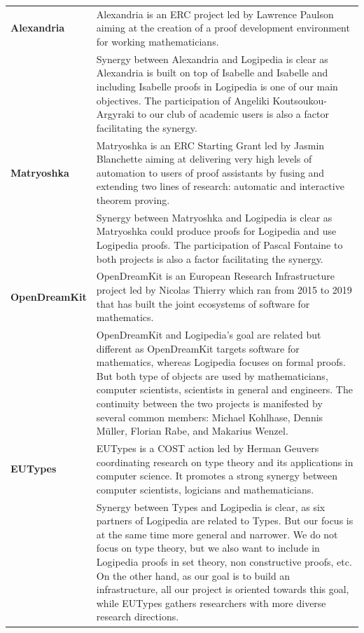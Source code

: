 \begin{longtable}{|p{}|p{}|}
\hline 
{\bf Alexandria}
&
Alexandria is an ERC project led by Lawrence Paulson aiming at the
creation of a proof development environment for working mathematicians.
\\
&
\hspace{0.4cm}
Synergy between Alexandria and Logipedia is clear as Alexandria
is built on top of Isabelle and Isabelle and including Isabelle proofs
in Logipedia is one of our main objectives.  The participation of
Angeliki Koutsoukou-Argyraki to our club of academic users is also
a factor facilitating the synergy.
\\
\hline
{\bf Matryoshka} 
& 
Matryoshka is an ERC Starting Grant led by Jasmin Blanchette aiming at
delivering very high levels of automation to users of proof assistants
by fusing and extending two lines of research: automatic and
interactive theorem proving.
\\
&
\hspace{0.4cm} Synergy between Matryoshka and Logipedia is clear
as Matryoshka could produce proofs for Logipedia and use Logipedia
proofs. The participation of Pascal Fontaine to both projects is also a
factor facilitating the synergy.
\\
\hline
{\bf OpenDreamKit} 
& 
OpenDreamKit is an European Research Infrastructure project led by
Nicolas Thierry which ran from 2015 to 2019 that has built the joint
ecosystems of software for mathematics.
\\
&
\hspace{0.4cm}
OpenDreamKit and Logipedia's goal are related but different as OpenDreamKit
targets software for mathematics, whereas Logipedia focuses on formal proofs. But both type 
of objects are used by mathematicians, computer scientists, scientists in 
general and engineers. The continuity between the two projects is manifested 
by several common members: Michael Kohlhase, Dennis Müller, 
Florian Rabe, and Makarius Wenzel. 
\\
\hline
{\bf EUTypes} 
& 
EUTypes is a COST action led by Herman Geuvers coordinating research
on type theory and its applications in computer science.  It promotes
a strong synergy between computer scientists, logicians and
mathematicians.
\\
&
\hspace{0.4cm}
Synergy between Types and Logipedia is clear, as six partners of
Logipedia are related to Types. But our focus is at the same time more
general and narrower. We do not focus on type theory, but we also want
to include in Logipedia proofs in set theory, non constructive proofs,
etc. On the other hand, as our goal is to build an infrastructure,
all our project is oriented towards this goal, while EUTypes gathers
researchers with more diverse research directions.
\\
\hline
\end{longtable}

